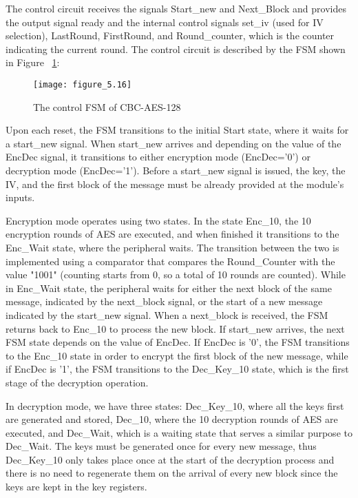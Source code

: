 The control circuit receives the signals Start\_new and Next\_Block and provides the output signal ready and the internal control signals set\_iv (used for IV selection), LastRound, FirstRound, and Round\_counter, which is the counter indicating the current round. The control circuit is described by the FSM shown in Figure ~\ref{fig:figure_5.16}:

\begin{figure}
\centering
\texttt{[image: figure\_5.16]}\\
\caption{ The control FSM of CBC-AES-128 }
\label{fig:figure_5.16}
\end{figure}


Upon each reset, the FSM transitions to the initial Start state, where it waits for a start\_new signal. When start\_new arrives and depending on the value of the EncDec signal, it transitions to either encryption mode (EncDec='0') or decryption mode (EncDec='1'). Before a start\_new signal is issued, the key, the IV, and the first block of the message must be already provided at the module's inputs.

Encryption mode operates using two states. In the state Enc\_10, the 10 encryption rounds of AES are executed, and when finished it transitions to the Enc\_Wait state, where the peripheral waits. The transition between the two is implemented using a comparator that compares the Round\_Counter with the value "1001" (counting starts from 0, so a total of 10 rounds are counted). While in Enc\_Wait state, the peripheral waits for either the next block of the same message, indicated by the next\_block signal, or the start of a new message indicated by the start\_new signal. When a next\_block is received, the FSM returns back to Enc\_10 to process the new block. If start\_new arrives, the next FSM state depends on the value of EncDec. If  EncDec is '0', the FSM transitions to the Enc\_10  state in order to encrypt the first block of the new message, while if EncDec is '1', the FSM transitions to the Dec\_Key\_10 state, which is the first stage of the decryption operation.

In decryption mode, we have three states: Dec\_Key\_10, where all the keys first are generated and stored, Dec\_10, where the 10 decryption rounds of AES are executed, and Dec\_Wait, which is a waiting state that serves a similar purpose to Dec\_Wait. The keys must be generated once for every new message, thus Dec\_Key\_10 only takes place once at the start of the decryption process and there is no need to regenerate them on the arrival of every new block since the keys are kept in the key registers.

